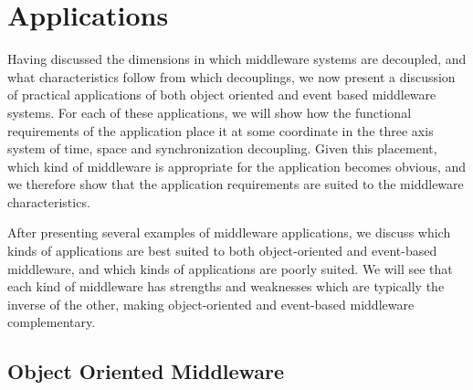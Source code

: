 \documentclass{acm_proc_article-sp}
\begin{document}
% 
% 
% 
% 
% 
% 
% 
% 



\section{Applications}
\label{sec:apps}

Having discussed the dimensions in which middleware systems are decoupled, and what characteristics follow from which decouplings, we now present a discussion of practical applications of both object oriented and event based middleware systems. For each of these applications, we will show how the functional requirements of the application place it at some coordinate in the three axis system of time, space and synchronization decoupling. Given this placement, which kind of middleware is appropriate for the application becomes obvious, and we therefore show that the application requirements are suited to the middleware characteristics. 

After presenting several examples of middleware applications, we discuss which kinds of applications are best suited to both object-oriented and event-based middleware, and which kinds of applications are poorly suited. We will see that each kind of middleware has strengths and weaknesses which are typically the inverse of the other, making object-oriented and event-based middleware complementary. 

\subsection{Object Oriented Middleware}
\label{sec:appsobj}
\end{document}
